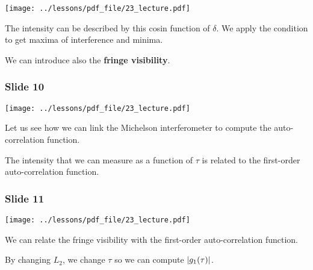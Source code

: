 \documentclass[../main/main.tex]{subfiles}
\begin{document}
\begin{minipage}[]{0.5\linewidth}
\centering
\texttt{[image: ../lessons/pdf\_file/23\_lecture.pdf]}
\end{minipage}
\hspace{0.3cm}\vspace{0.3cm}
\begin{minipage}[c]{0.47\linewidth}

The intensity can be described by this cosin function of \( \delta  \). We apply the condition to get maxima of interference and minima.

We can introduce also the \textbf{fringe visibility}.

\end{minipage}

\subsubsection*{Slide 10}

\begin{minipage}[]{0.5\linewidth}
\centering
\texttt{[image: ../lessons/pdf\_file/23\_lecture.pdf]}
\end{minipage}
\hspace{0.3cm}\vspace{0.3cm}
\begin{minipage}[c]{0.47\linewidth}

Let us see how we can link the Michelson interferometer to compute the auto-correlation function.

The intensity that we can measure as a function of \( \tau  \) is related to the first-order auto-correlation function.

\end{minipage}

\subsubsection*{Slide 11}

\begin{minipage}[]{0.5\linewidth}
\centering
\texttt{[image: ../lessons/pdf\_file/23\_lecture.pdf]}
\end{minipage}
\hspace{0.3cm}\vspace{0.3cm}
\begin{minipage}[c]{0.47\linewidth}

We can relate the fringe visibility with the first-order auto-correlation function.

By changing \( L_2 \), we change \( \tau  \) so we can compute \( \abs{g_1 (\tau )}  \).

\end{minipage}
\end{document}
